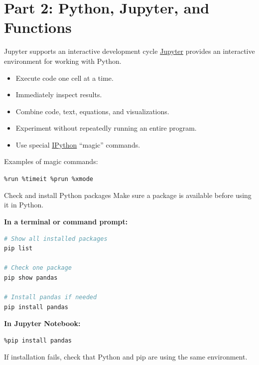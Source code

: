 \documentclass[11pt,aspectratio=43]{beamer}
\begin{document}
\section{Part 2: Python, Jupyter, and Functions}

\begin{frame}{Jupyter supports an interactive development cycle}
\href{https://jupyter.org}{Jupyter} provides an interactive environment for working with Python.

\begin{itemize}
  \item Execute code one cell at a time.
  \item Immediately inspect results.
  \item Combine code, text, equations, and visualizations.
  \item Experiment without repeatedly running an entire program.
  \item Use special \href{https://ipython.org}{IPython} ``magic'' commands.
\end{itemize}

\vspace{0.3cm}
Examples of magic commands:

\begin{center}
  \texttt{\%run \qquad \%timeit \qquad \%prun \qquad \%xmode}
\end{center}
\end{frame}

\begin{frame}[fragile]{Check and install Python packages}
Make sure a package is available before using it in Python.

\vspace{0.4em}
\textbf{In a terminal or command prompt:}

\begin{lstlisting}[language=bash]
# Show all installed packages
pip list

# Check one package
pip show pandas

# Install pandas if needed
pip install pandas
\end{lstlisting}

\vspace{0.3em}
\textbf{In Jupyter Notebook:}

\begin{lstlisting}
%pip install pandas
\end{lstlisting}

\vspace{0.3em}
If installation fails, check that Python and pip are using the same environment.
\end{frame}
\end{document}
